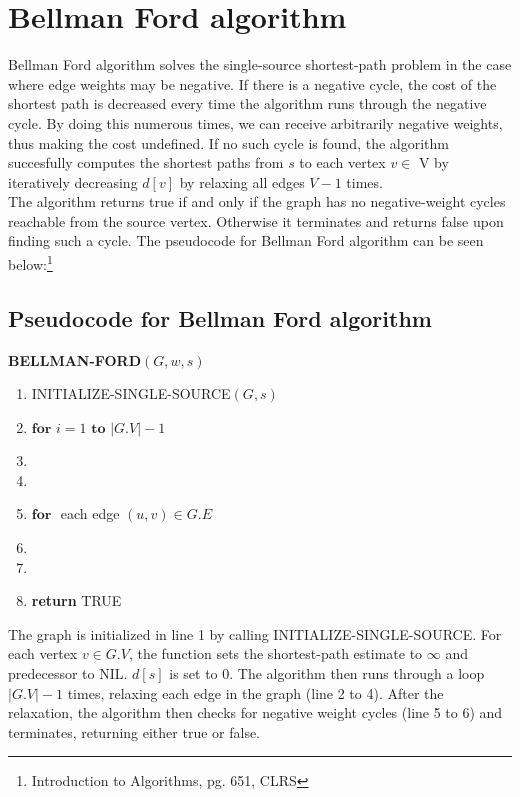 \documentclass[11pt]{article}
\begin{document}
\section{Bellman Ford algorithm}
Bellman Ford algorithm solves the single-source shortest-path problem in the case where edge weights may be negative. If there is a negative cycle, the cost of the shortest path is decreased every time the algorithm runs through the negative cycle. By doing this numerous times, we can receive arbitrarily negative weights, thus making the cost undefined. If no such cycle is found, the algorithm succesfully computes the shortest paths from $s$ to each vertex $v \in$ V by iteratively decreasing $d[v]$ by relaxing all edges $V-1$ times.\\
The algorithm returns true if and only if the graph has no negative-weight cycles reachable from the source vertex. Otherwise it terminates and returns false upon finding such a cycle. The pseudocode for Bellman Ford algorithm can be seen below:\footnote{Introduction to Algorithms, pg. 651, CLRS}

\subsection{Pseudocode for Bellman Ford algorithm}

\hspace{4ex}\textbf{BELLMAN-FORD$(G, w, s)$}
\begin{enumerate}
\setlength\itemsep{0em}
\item INITIALIZE-SINGLE-SOURCE$(G, s)$
\item $\textbf{for } i = 1 \textbf{ to } |G.V| -1$
\item {}
\item \tab{}
\item $\textbf{for }$ each edge $(u,v) \in G.E$
\item {}
\item \tab{}
\item \textbf{return } TRUE
\end{enumerate}

\noindent The graph is initialized in line 1 by calling INITIALIZE-SINGLE-SOURCE. For each vertex $v \in G.V$, the function sets the shortest-path estimate to $\infty$ and predecessor to NIL. $d[s]$ is set to 0. The algorithm then runs through a loop $|G.V|-1$ times, relaxing each edge in the graph (line 2 to 4). After the relaxation, the algorithm then checks for negative weight cycles (line 5 to 6) and terminates, returning either true or false. 
\end{document}
